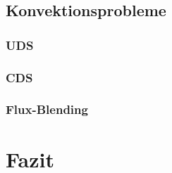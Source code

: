 \documentclass[colorback,longdoc,blackrule,bigchapter,accentcolor=tud2d,11pt]{tudreport}
\begin{document}
\section{Konvektionsprobleme}
\subsection{UDS}
\subsection{CDS}
\subsection{Flux-Blending}
\cleardoublepage


\cleardoublepage

\chapter{Fazit}
\cleardoublepage



\nocite{*}

%
\end{document}
